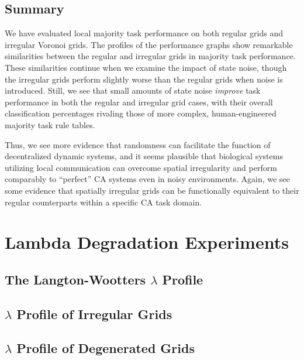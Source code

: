 \documentclass[a4paper,11pt]{report}
\begin{document}
\section{Summary}


We have evaluated local majority task performance on both regular grids and irregular Voronoi grids. The profiles of the performance graphs show remarkable similarities between the regular and irregular grids in majority task performance. These similarities continue when we examine the impact of state noise, though the irregular grids perform slightly worse than the regular grids when noise is introduced. Still, we see that small amounts of state noise \textit{improve} task performance in both the regular and irregular grid cases, with their overall classification percentages rivaling those of more complex, human-engineered majority task rule tables.

Thus, we see more evidence that randomness can facilitate the function of decentralized dynamic systems, and it seems plausible that biological systems utilizing local communication can overcome spatial irregularity and perform comparably to ``perfect'' CA systems even in noisy environments. Again, we see some evidence that spatially irregular grids can be functionally equivalent to their regular counterparts within a specific CA task domain.

\processdelayedfloats


\chapter{Lambda Degradation Experiments}
\label{ch:lambda_degen}

\section{The Langton-Wootters $\lambda$ Profile}

\section{$\lambda$ Profile of Irregular Grids}

\section{$\lambda$ Profile of Degenerated Grids}
\end{document}
